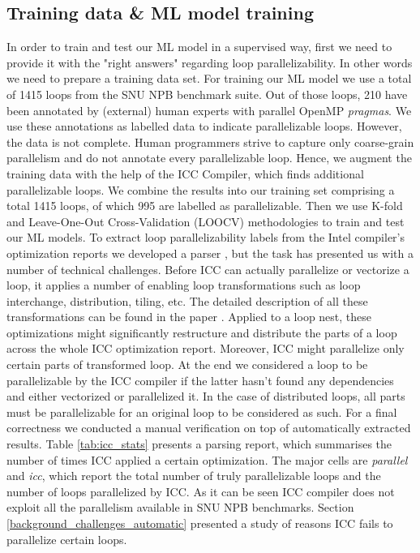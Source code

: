 \subsection{Training data \& ML model training}
\label{loop_classification_labels}
\quad In order to train and test our ML model in a supervised way, first we need to provide it with the "right answers" regarding loop parallelizability. In other words we need to prepare a training data set.\newline\null
\quad For training our ML model we use a total of 1415 loops from the SNU NPB benchmark suite. Out of those loops, 210 have been annotated by (external) human experts with parallel OpenMP \textit{pragmas}. We use these annotations as labelled data to indicate parallelizable loops. However, the data is not complete. Human programmers strive to capture only coarse-grain parallelism and do not annotate every parallelizable loop. Hence, we augment the training data with the help of the ICC Compiler, which finds additional parallelizable loops. We combine the results into our training set comprising a total 1415 loops, of which 995 are labelled as parallelizable. Then we use K-fold and Leave-One-Out Cross-Validation (LOOCV) methodologies to train and test our ML models.\newline\null
\quad To extract loop parallelizability labels from the Intel compiler's optimization reports we developed a parser \cite{github-icc-parser}, but the task has presented us with a number of technical challenges. Before ICC can actually parallelize or vectorize a loop, it applies a number of enabling loop transformations such as loop interchange, distribution, tiling, etc. The detailed description of all these transformations can be found in the paper \cite{Bacon:1994:CTH:197405.197406}. Applied to a loop nest, these optimizations might significantly restructure and distribute the parts of a loop across the whole ICC optimization report. Moreover, ICC might parallelize only certain parts of transformed loop. At the end we considered a loop to be parallelizable by the ICC compiler if the latter hasn't found any dependencies and either vectorized or parallelized it. In the case of distributed loops, all parts must be parallelizable for an original loop to be considered as such. For a final correctness we conducted a manual verification on top of automatically extracted results.\newline\null
\quad Table \ref{tab:icc_stats} presents a parsing report, which summarises the number of times ICC applied a certain optimization. The major cells are \textit{parallel} and \textit{icc}, which report the total number of truly parallelizable loops and the number of loops parallelized by ICC. As it can be seen ICC compiler does not exploit all the parallelism available in SNU NPB benchmarks. Section \ref{background_challenges_automatic} presented a study of reasons ICC fails to parallelize certain loops.
